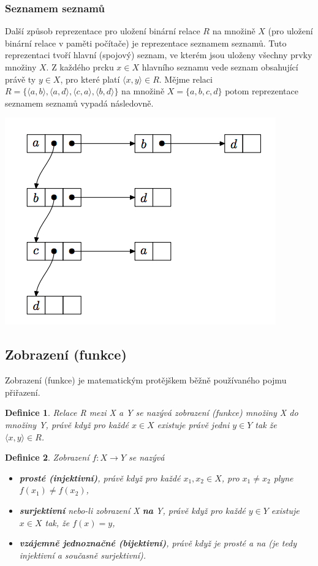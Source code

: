 \documentclass[12pt,a4paper]{article}
\newtheorem{definition}{Definice}
\begin{document}
\subsubsection{Seznamem seznamů}
Další způsob reprezentace pro uložení binární relace $R$ na množině $X$ (pro uložení binární relace v paměti počítače) je reprezentace seznamem seznamů. Tuto reprezentaci tvoří hlavní (spojový) seznam, ve kterém jsou uloženy všechny prvky množiny $X$. Z každého prcku $x \in X$ hlavního seznamu vede seznam obsahující právě ty $y \in X$, pro které platí $\langle x, y \rangle \in R$. Mějme relaci $R = \{\langle a, b\rangle,\langle a, d\rangle,\langle c, a\rangle,\langle b, d\rangle\}$ na množině $X = \{a,b,c,d\}$ potom reprezentace seznamem seznamů vypadá následovně.

\begin{center}
	\includegraphics[scale=0.6]{img/RelationList}
\end{center}

\subsection{Zobrazení (funkce)}
Zobrazení (funkce) je matematickým protějškem běžně používaného pojmu přiřazení.

\begin{definition}
	Relace R mezi X a Y se nazývá zobrazení (funkce) množiny X do množiny Y, právě když pro každé $x \in X$ existuje právě jedni $y \in Y$ tak že $\langle x, y \rangle \in R$.
\end{definition}

\begin{definition}
	Zobrazení $f : X \rightarrow Y$ se nazývá
	\begin{itemize}
		\item[a)] \textbf{prosté (injektivní)}, právě když pro každé $x_1,x_2 \in X$, pro $x_1 \not= x_2$ plyne $f(x_1) \not= f(x_2)$,
		\item[b)] \textbf{surjektivní} nebo-li zobrazení X \textbf{na} Y, právě když pro každé $y \in Y$ existuje $x \in X$ tak, že  $f(x) = y$,
		\item[c)] \textbf{vzájemně jednoznačné (bijektivní)}, právě když je prosté a na (je tedy injektivní a současně surjektivní).
	\end{itemize}
\end{definition}
\end{document}
